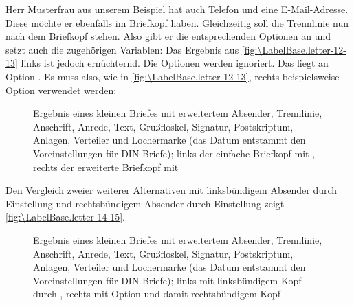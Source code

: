 \begin{Example}
  Herr Musterfrau aus unserem Beispiel hat auch Telefon und eine
  E-Mail-Adresse. Diese möchte er ebenfalls im Briefkopf haben. Gleichzeitig
  soll die Trennlinie nun nach dem Briefkopf stehen. Also gibt er die
  entsprechenden Optionen an und setzt auch die zugehörigen Variablen:%
  Das Ergebnis aus \autoref{fig:\LabelBase.letter-12-13} links ist jedoch
  ernüchternd. Die Optionen werden ignoriert. Das liegt %
  \iffalse%
  daran, dass diese zusätzlichen Variablen und Optionen nur im erweiterten
  Briefkopf verwendet werden. %
  \else%
  an Option . %
  \fi%
  Es muss also, wie in \autoref{fig:\LabelBase.letter-12-13}, rechts
  beispielsweise Option 
  verwendet werden:%
  \begin{figure}
    \centering
    \quad
    \caption[{Beispiel: Brief mit erweitertem Absender, Trennlinie, Anschrift,
      Anrede, Text, Grußfloskel, Signatur, Postskriptum, Anlagen, Verteiler
      und Lochermarke; Standard- vs. erweiterter Briefkopf}]{Ergebnis eines
      kleinen Briefes mit erweitertem Absender, Trennlinie, Anschrift, Anrede,
      Text, Grußfloskel, Signatur, Postskriptum, Anlagen, Verteiler und
      Lochermarke (das Datum entstammt den Voreinstellungen für DIN-Briefe);
      links der einfache Briefkopf mit
      , rechts der erweiterte
      Briefkopf mit }
    \label{fig:\LabelBase.letter-12-13}
  \end{figure}

  Den Vergleich zweier weiterer Alternativen mit linksbündigem Absender durch
  Einstellung  und rechtsbündigem
  Absender durch Einstellung  zeigt
  \autoref{fig:\LabelBase.letter-14-15}.
  \begin{figure}
    \centering
    \quad
    \caption[{Beispiel: Brief mit erweitertem Absender, Trennlinie, Anschrift,
      Anrede, Text, Grußfloskel, Signatur, Postskriptum, Anlagen, Verteiler
      und Lochermarke; links- vs. rechtsbündiger Briefkopf}]{Ergebnis eines
      kleinen Briefes mit erweitertem Absender, Trennlinie, Anschrift, Anrede,
      Text, Grußfloskel, Signatur, Postskriptum, Anlagen, Verteiler und
      Lochermarke (das Datum entstammt den Voreinstellungen für DIN-Briefe);
      links mit linksbündigem Kopf durch
      , rechts mit Option
       und damit rechtsbündigem
      Kopf}
    \label{fig:\LabelBase.letter-14-15}
  \end{figure}
\end{Example}
%
\EndIndexGroup
\ExampleEndFix%


